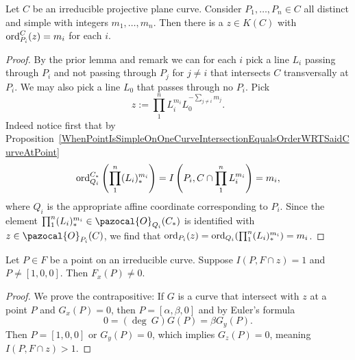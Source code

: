     \begin{lemma}
        Let $C$ be an irreducible projective plane curve. Consider $P_1,\dots, P_n\in C$ all distinct and simple with integers $m_1,\dots,m_n$. Then there is a $z\in K(C)$ with $\mathrm{ord}^C_{P_i}(z)=m_i$ for each $i$.
    \end{lemma}
    \begin{proof}
        By the prior lemma and remark we can for each $i$ pick a line $L_i$ passing through $P_i$ and not passing through $P_j$ for  $j\neq i$ that intersects $C$ transversally at $P_i$. We may also pick a line $L_0$ that passes through no $P_i$. Pick
        $$z := \prod_1^n L_i^{m_i}L_0^{-\sum_{j\neq i} m_j}.$$
        Indeed notice first that by Proposition~\ref{WhenPointIsSimpleOnOneCurveIntersectionEqualsOrderWRTSaidCurveAtPoint}
        $$\mathrm{ord}^{C_\ast}_{Q_i}\left(\prod_1^n (L_i)_\ast^{m_i}\right)=I\left(P_i,C\cap \prod_1^n L_i^{m_i}\right) = m_i,$$
        where $Q_i$ is the appropriate affine coordinate corresponding to $P_i$. Since the element $\prod_1^n (L_i)_\ast^{m_i}\in \pazocal{O}_{Q_i}(C_\ast)$ is identified with $z\in \pazocal{O}_{P_i}(C)$, we find that
        $\mathrm{ord}_{P_i}(z)=\mathrm{ord}_{Q_i}(\prod_1^n (L_i)_\ast^{m_i})=m_i$.
    \end{proof}
    \begin{lemma}
        Let $P\in F$ be a point on an irreducible curve. Suppose $I(P,F\cap z)=1$ and $P\neq [1,0,0]$. Then $F_x(P)\neq 0$.
    \end{lemma}
    \begin{proof}
        We prove the contrapositive: If $G$ is a curve that intersect with $z$ at a point $P$ and $G_x(P)=0$, then $P= [\alpha,\beta, 0]$ and by Euler's formula  
        $$0 = (\deg \ G)G(P)= \beta G_y(P).$$
        Then $P = [1,0,0]$ or $G_y(P) = 0$, which implies $G_z(P) = 0$, meaning $I(P,F\cap z)>1$. 
    \end{proof}
